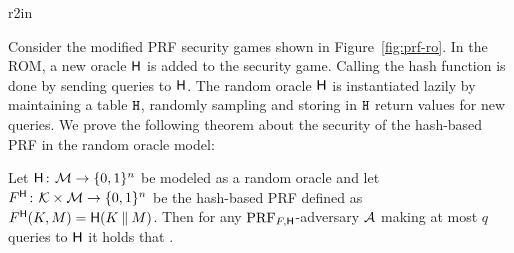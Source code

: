 \begin{wrapfigure}{r}{2in}
  \centering
{}
\caption{PRF security games in the random oracle model.}
\label{fig:prf-ro}
\end{wrapfigure}

Consider the modified PRF security games shown in Figure~\ref{fig:prf-ro}.
In the ROM, a new oracle $\mathsf{H}$ is added to the security game.
Calling the hash function is done by sending queries to $\mathsf{H}$.
The random oracle $\mathsf{H}$ is instantiated lazily by maintaining a table $\mathtt{H}$, randomly sampling and storing in $\mathtt{H}$ return values for new queries.
We prove the following theorem about the security of the hash-based PRF in the random oracle model:

\begin{theorem}
Let  $\mathsf{H}{{\kern .05em}\colon{\kern .05em}}{\cal M}\rightarrow\{0,1\}^n$ be modeled as a random oracle
and let $F^{\mathsf{H}}{{\kern .05em}\colon{\kern .05em}}{\cal K}\times{\cal M}\rightarrow\{0,1\}^n$ be the
hash-based PRF defined as $F^{\mathsf{H}}(K,M) = \mathsf{H}(K \: \| \: M)$.
Then for any $\textnormal{PRF}_{F,\mathsf{H}}$-adversary ${\mathcal A}$ making at most $q$ queries
to $\mathsf{H}$ it holds that
\bnm
   \le {} \;.
\enm
\end{theorem}


